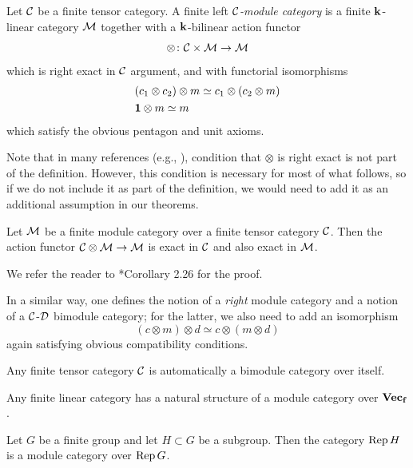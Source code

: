 \begin{definition}\label{d:module-cat}
  Let $\mathcal{C}$ be a finite tensor category. A finite left \emph{$\mathcal{C}$-module
  category} is a finite $\mathbf{k}$-linear category $\mathcal{M}$
  together with a $\mathbf{k}$-bilinear action functor
  $$
  \otimes\colon \mathcal{C} \times \mathcal{M} \to \mathcal{M}
  $$
  which is right exact in $\mathcal{C}$ argument, and with functorial isomorphisms
  \begin{align*}
  &(c_1\otimes c_2)\otimes m \simeq c_1 \otimes (c_2\otimes m)\\
  & \mathbf{1} \otimes m \simeq m
  \end{align*}
  which satisfy the obvious pentagon and unit axioms.
\end{definition}
Note that in many references (e.g., ), condition that
$\otimes$ is right exact is not part of the definition. However, this condition
is necessary for most of what follows, so if we do not include it as part of the
definition, we would need to add it as an additional assumption in our theorems.
\begin{theorem}\label{t:module-action-exact}
  Let $\mathcal{M}$ be a finite module category over a finite tensor category $\mathcal{C}$.
  Then the action functor $\mathcal{C}\otimes \mathcal{M}\to\mathcal{M}$ is exact in
  $\mathcal{C}$ and also exact in $\mathcal{M}$.
\end{theorem}
We refer the reader to *{Corollary 2.26} for the proof.

In a similar way, one defines the notion of a \emph{right} module category and a
notion of a $\mathcal{C}$-$\mathcal{D}$ bimodule category; for the latter, we also need to add
an isomorphism
$$
  (c\otimes m)\otimes d \simeq c\otimes (m\otimes d)
$$
again satisfying obvious compatibility conditions.

\begin{example}\label{x:tensor-self-bimodule}
  Any finite tensor category $\mathcal{C}$ is automatically a bimodule category
  over itself.
\end{example}

\begin{example}\label{x:linear-cat-module}
  Any finite linear category has a natural structure of a module category over
  $\mathbf{Vec_f}$.
\end{example}

\begin{example}\label{x:coset-module}
  Let $G$ be a finite group and let $H\subset G$ be a subgroup. Then the
  category $\operatorname{Rep} H$ is a module category over $\operatorname{Rep} G$.
\end{example}

